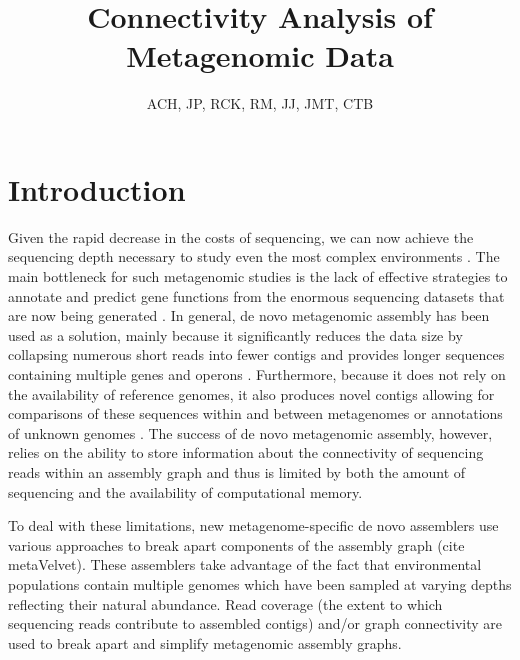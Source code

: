 \documentclass[11pt]{article} %
\begin{document}
\title{Connectivity Analysis of Metagenomic Data}
\author{ACH, JP, RCK, RM, JJ, JMT, CTB}
\maketitle

\section{Introduction}
Given the rapid decrease in the costs of sequencing, we can now achieve the sequencing depth necessary to study even the most complex environments \cite{Hess:2011p686,Qin:2010p189}.  The main bottleneck for such metagenomic studies is the lack of effective strategies to annotate and predict gene functions from the enormous sequencing datasets that are now being generated \cite{Hoff:2009p913,Kunin:2008p16,Noguchi:2006p968,Zhang:2012p959}.  In general, de novo metagenomic assembly has been used as a solution, mainly because it significantly reduces the data size by collapsing numerous short reads into fewer contigs and provides longer sequences containing multiple genes and operons \cite{Miller:2010p226,Pop:2009p798}.  Furthermore, because it does not rely on the availability of reference genomes, it also produces novel contigs allowing for comparisons of these sequences within and between metagenomes \cite{Li:2009p707,Schloss:2008p2} or annotations of unknown genomes \cite{Hess:2011p686}.  The success of de novo metagenomic assembly, however, relies on the ability to store information about the connectivity of sequencing reads within an assembly graph and thus is limited by both the amount of sequencing and the availability of computational memory. 

To deal with these limitations, new metagenome-specific de novo assemblers use various approaches to break apart components of the assembly graph  \cite{Peng:2011p898} (cite metaVelvet).  These assemblers take advantage of the fact that environmental populations contain multiple genomes which have been sampled at varying depths reflecting their natural abundance.  Read coverage (the extent to which sequencing reads contribute to assembled contigs) and/or graph connectivity are used to break apart and simplify metagenomic assembly graphs. 
\end{document}
